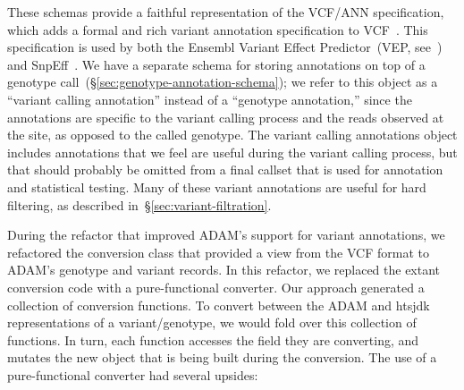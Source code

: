 \documentclass[phd]{ucbthesis}
\begin{document}
These schemas provide a faithful representation of the VCF/ANN specification,
which adds a formal and rich variant annotation specification to
VCF~\cite{ann}. This specification is used by both the {Ensembl Variant
  Effect Predictor}~(VEP, see~\cite{mclaren10}) and {SnpEff}~\cite{cingolani12}.
We have a separate schema for storing annotations on top of a genotype call~(\S\ref{sec:genotype-annotation-schema}); we
refer to this object as a ``variant calling annotation'' instead of a ``genotype
annotation,'' since the annotations are specific to the variant calling process
and the reads observed at the site, as opposed to the called genotype.
The variant calling annotations object includes annotations that we feel are
useful during the variant calling process, but that should probably be omitted
from a final callset that is used for annotation and statistical testing. Many
of these variant annotations are useful for hard filtering, as described
in~\S\ref{sec:variant-filtration}.

During the refactor that improved {ADAM}'s support for variant
annotations, we refactored the conversion class that provided a view from the
VCF format to {ADAM}'s genotype and variant records. In this refactor,
we replaced the extant conversion code with a pure-functional converter. Our
approach generated a collection of conversion functions. To convert between
the {ADAM} and {htsjdk} representations of a variant/genotype,
we would fold over this collection of functions. In turn, each function accesses
the field they are converting, and mutates the new object that is being built
during the conversion. The use of a pure-functional converter had several
upsides:
\end{document}
